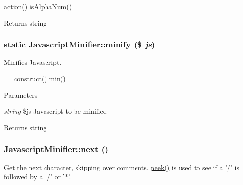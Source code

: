 \hyperlink{classJavascriptMinifier_a0c75407b85df75294ca362f65285df79}{action()}  \hyperlink{classJavascriptMinifier_a0a745cbf92ba3dd748b736b1f20abd87}{isAlphaNum()} \begin{DoxyReturn}{Returns}
string 
\end{DoxyReturn}
\hypertarget{classJavascriptMinifier_ab08f36fceb7761733428ba4ce9375b71}{
\subsubsection[{minify}]{\setlength{\rightskip}{0pt plus 5cm}static JavascriptMinifier::minify (\$ {\em js})}}
\label{classJavascriptMinifier_ab08f36fceb7761733428ba4ce9375b71}
Minifies Javascript.

\hyperlink{classJavascriptMinifier_a3758aa5599a06cb1365171b4ef7cb818}{\_\-\_\-construct()}  \hyperlink{classJavascriptMinifier_a67114eb8f254e1765a79ba839e979715}{min()} 
\begin{DoxyParams}{Parameters}
\item[{\em string}]\$js Javascript to be minified \end{DoxyParams}
\begin{DoxyReturn}{Returns}
string 
\end{DoxyReturn}
\hypertarget{classJavascriptMinifier_af6ec11eefc8cd9f0e456fa9d37a8c59d}{
\subsubsection[{next}]{\setlength{\rightskip}{0pt plus 5cm}JavascriptMinifier::next ()}}
\label{classJavascriptMinifier_af6ec11eefc8cd9f0e456fa9d37a8c59d}
Get the next character, skipping over comments. \hyperlink{classJavascriptMinifier_a7cb211bf16d3b5cc798d8fed55adff5e}{peek()} is used to see if a '/' is followed by a '/' or '$\ast$'.

